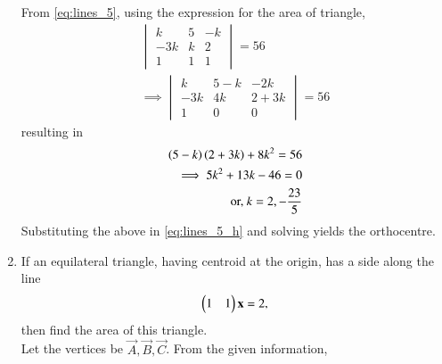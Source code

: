 \documentclass[journal,12pt,twocolumn]{IEEEtran}
\begin{document}
\begin{enumerate}[label=\arabic*]
From \eqref{eq:lines_5}, using the expression for the area of triangle,
\begin{align}
\begin{vmatrix}
k & 5 & -k\\-3k & k & 2 \\ 1 & 1 & 1
\end{vmatrix} = 56
\nonumber \\
\implies
\begin{vmatrix}
k & 5-k & -2k\\-3k & 4k & 2+3k \\ 1 & 0 & 0
\end{vmatrix} = 56
\end{align}
%
resulting in
\begin{align}
\left(5-k\right)
\left(2+3k\right)+8k^2=56
\\
\implies 5k^2+13k-46 = 0
\\
\text{or, } k = 2, -\frac{23}{5}
\end{align}
Substituting the above in \eqref{eq:lines_5_h} and solving yields the orthocentre.
\item If an equilateral triangle, having centroid at the origin, has a side along the line
\begin{equation}
\label{eq:lines_6_ab}
\begin{pmatrix}1 & 1\end{pmatrix}\mathbf{x} = 2,
\end{equation}
then find the area of this triangle.
\\
\solution Let the vertices be $\vec{A},\vec{B},\vec{C}$. From the given information, 
\begin{align}

\end{align}
\end{enumerate}
\end{document}
